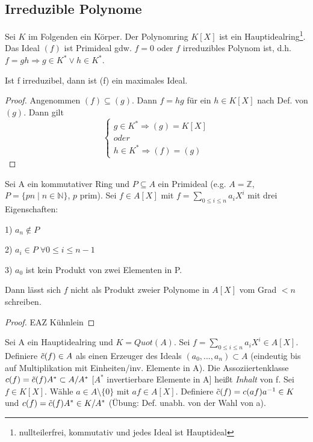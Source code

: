 \documentclass[../main.tex]{subfiles}
\begin{document}
\subsection{Irreduzible Polynome}
\begin{definition}
    Sei $K$ im Folgenden ein Körper. Der Polynomring $K[X]$ ist ein Hauptidealring\footnote{nullteilerfrei, kommutativ und jedes Ideal ist Hauptideal}. Das Ideal $(f)$ ist Primideal gdw. $f = 0$ oder $f$ irreduzibles Polynom ist, d.h. $f = gh \Rightarrow g \in K^* \vee h \in K^*$.
\end{definition}
\begin{lemma} \label{theo:2.2}
    Ist f irreduzibel, dann ist (f) ein maximales Ideal.
\end{lemma}
\begin{proof}
    Angenommen $(f) \subseteq (g)$. Dann $f = hg$ für ein $h \in K[X]$ nach Def. von $(g)$. Dann gilt
    \begin{equation*}
        \begin{cases}
            g \in K^* \Rightarrow (g) = K[X] \\
            oder \\
            h \in K^* \Rightarrow (f) = (g)
        \end{cases}
    \end{equation*}
\end{proof}
\begin{theorem}[Eisensteinkriterium]
    Sei A ein kommutativer Ring und $P \subseteq A$ ein Primideal (e.g. $A = \mathbb{Z}$, $P = \{pn \mid n \in \mathbb{N}\}$, $p$ prim). Sei $f \in A[X]$ mit $f = \sum_{0 \leq i \leq n} a_iX^i$ mit drei Eigenschaften:
    
    1) $a_n \notin P$

    2) $a_i \in P \; \forall 0 \leq i \leq n-1$

    3) $a_0$ ist kein Produkt von zwei Elementen in P.

    Dann lässt sich $f$ nicht als Produkt zweier Polynome in $A[X]$ vom Grad $< n$ schreiben.
\end{theorem}
\begin{proof}
    EAZ Kühnlein
\end{proof}
\begin{definition}[Inhalt]
    Sei A ein Hauptidealring und $K = Quot(A)$. Sei $f = \sum_{0 \leq i \leq n} a_i X^i \in A[X]$. Definiere $\Tilde{c}(f) \in A$ als einen Erzeuger des Ideals $(a_0, ..., a_n) \subset A$ (eindeutig bis auf Multiplikation mit Einheiten/inv. Elemente in A). Die Assoziiertenklasse $c(f) = \Tilde{c}(f)A^* \subset A/A^*$ [$A^*$ invertierbare Elemente in A] heißt \emph{Inhalt} von f. Sei $f \in K[X]$. Wähle $a \in A \setminus \{0\}$ mit $af \in A[X]$. Definiere $\Tilde{c}(f) = c(af)a^{-1} \in K$ und $c(f) = \Tilde{c}(f)A^* \in K/A^*$ (Übung: Def. unabh. von der Wahl von a).
\end{definition}
\end{document}
